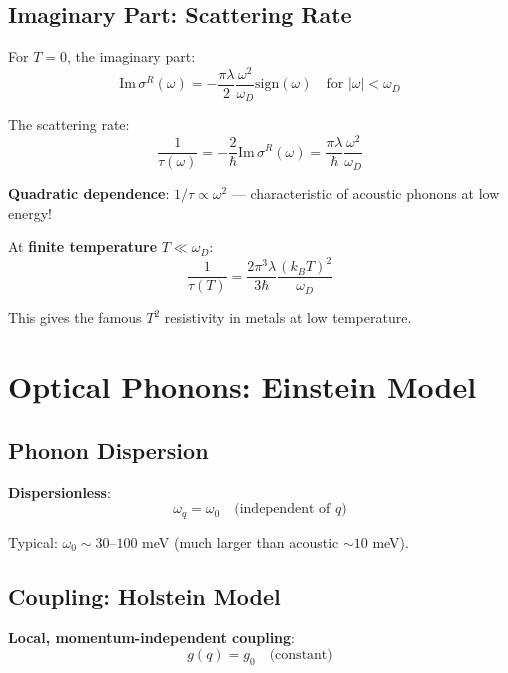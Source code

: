 \documentclass[12pt]{article}
\begin{document}
\subsection{Imaginary Part: Scattering Rate}

For $T = 0$, the imaginary part:
\begin{equation}
\boxed{
\text{Im}\,\sigma^R(\omega) = -\frac{\pi\lambda}{2} \frac{\omega^2}{\omega_D} \text{sign}(\omega) \quad \text{for } |\omega| < \omega_D
}
\end{equation}

The scattering rate:
\begin{equation}
\boxed{
\frac{1}{\tau(\omega)} = -\frac{2}{\hbar}\text{Im}\,\sigma^R(\omega) = \frac{\pi\lambda}{\hbar} \frac{\omega^2}{\omega_D}
}
\end{equation}

\textbf{Quadratic dependence}: $1/\tau \propto \omega^2$ — characteristic of acoustic phonons at low energy!

At \textbf{finite temperature} $T \ll \omega_D$:
\begin{equation}
\boxed{
\frac{1}{\tau(T)} = \frac{2\pi^3 \lambda}{3\hbar} \frac{(k_B T)^2}{\omega_D}
}
\end{equation}

This gives the famous $T^2$ resistivity in metals at low temperature.

\section{Optical Phonons: Einstein Model}

\subsection{Phonon Dispersion}

\textbf{Dispersionless}:
\begin{equation}
\boxed{
\omega_q = \omega_0 \quad \text{(independent of $q$)}
}
\end{equation}

Typical: $\omega_0 \sim 30\text{--}100$ meV (much larger than acoustic $\sim 10$ meV).

\subsection{Coupling: Holstein Model}

\textbf{Local, momentum-independent coupling}:
\begin{equation}
\boxed{
g(q) = g_0 \quad \text{(constant)}
}
\end{equation}
\end{document}
